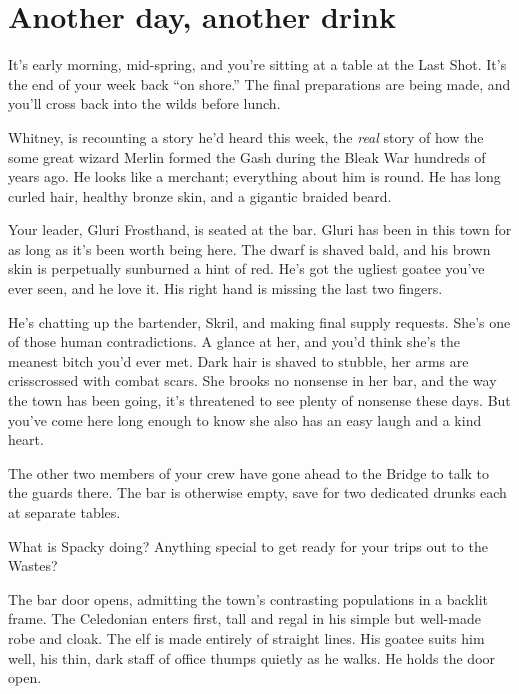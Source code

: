 \section{Another day, another drink}
\begin{multicols}{2}
  \begin{aloud}
    It's early morning, mid-spring, and you're sitting at a table at the Last Shot.
    It's the end of your week back ``on shore.''
    The final preparations are being made, and you'll cross back into the wilds before lunch.

    Whitney, is recounting a story he'd heard this week,
      the \emph{real} story of how the some great wizard Merlin formed the Gash during the
      Bleak War hundreds of years ago.
    He looks like a merchant;
     everything about him is round.
    He has long curled hair, healthy bronze skin, and a gigantic braided beard.

    Your leader, Gluri Frosthand, is seated at the bar.
    Gluri has been in this town for as long as it's been worth being here.
    The dwarf is shaved bald, and his brown skin is perpetually sunburned a hint of red.
    He's got the ugliest goatee you've ever seen, and he love it.
    His right hand is missing the last two fingers.

    He's chatting up the bartender, Skril, and making final supply requests.
    She's one of those human contradictions.
    A glance at her, and you'd think she's the meanest bitch you'd ever met.
    Dark hair is shaved to stubble, her arms are crisscrossed with combat scars.
    She brooks no nonsense in her bar, and the way the town has been going, it's threatened to see
      plenty of nonsense these days.
    But you've come here long enough to know she also has an easy laugh and a kind heart.

    The other two members of your crew have gone ahead to the Bridge to talk to the guards there.
    The bar is otherwise empty, save for two dedicated drunks each at separate tables.

  \end{aloud}

  What is Spacky doing?
  Anything special to get ready for your trips out to the Wastes?

  \begin{aloud}
    The bar door opens, admitting the town's contrasting populations in a backlit frame.
    The Celedonian enters first, tall and regal in his simple but well-made robe and cloak.
    The elf is made entirely of straight lines.
    His goatee suits him well, his thin, dark staff of office thumps quietly as he walks.
    He holds the door open.


\end{aloud}
\end{multicols}

